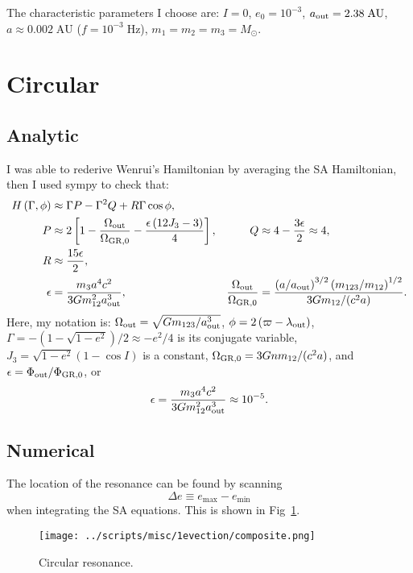 \documentclass[11pt,
        usenames, %
        dvipsnames %
    ]{article}
\newcommand*{\p}[1]{\left(#1\right)}
\newcommand*{\s}[1]{\left[#1\right]}
\begin{document}
The characteristic parameters I choose are: $I = 0$, $e_{0} = 10^{-3}$, $a_{\rm
out} = 2.38\;\mathrm{AU}$, $a \approx 0.002\;\mathrm{AU}$ ($f =
10^{-3}\;\mathrm{Hz}$), $m_1 = m_2 = m_3 = M_{\odot}$.

\section{Circular}

\subsection{Analytic}

I was able to rederive Wenrui's Hamiltonian by averaging the SA Hamiltonian,
then I used sympy to check that:
\begin{align}
    H\p{\Gamma,\phi} &\approx \Gamma P - \Gamma^2 Q + R \Gamma \cos \phi,&&\\
        P &\approx 2\s{1 - \frac{\Omega_{\rm out}}{\Omega_{\rm GR, 0}} -
            \frac{\epsilon\p{12 J_3 - 3}}{4}},&
        Q &\approx 4 - \frac{3\epsilon}{2} \approx 4,\nonumber\\
        R &\approx \frac{15\epsilon}{2},\\
        \epsilon &= \frac{m_3a^4 c^2}{3Gm_{12}^2a_{\rm out}^3},&
        \frac{\Omega_{\rm out}}{\Omega_{\rm GR, 0}}
            &= \frac{\p{a / a_{\rm out}}^{3/2}\p{m_{123} / m_{12}}^{1/2}}{
                3Gm_{12} / (c^2a)}.
\end{align}
Here, my notation is: $\Omega_{\rm out} = \sqrt{Gm_{123}/a_{\rm out}^3}$, $\phi
= 2\p{\varpi - \lambda_{\rm out}}$, $\Gamma = -\p{1 - \sqrt{1 - e^2}} / 2
\approx -e^2/4$ is its conjugate variable, $J_3 = \sqrt{1 - e^2}\p{1 - \cos I}$
is a constant, $\Omega_{\rm GR, 0} = 3Gnm_{12} / (c^2a)$, and $\epsilon =
\Phi_{\rm out} / \Phi_{\rm GR, 0}$, or
\begin{equation}
    \epsilon = \frac{m_3a^4 c^2}{3Gm_{12}^2a_{\rm out}^3} \approx 10^{-5}.
\end{equation}

\subsection{Numerical}

The location of the resonance can be found by scanning
\begin{equation}
    \Delta e \equiv e_{\max} - e_{\min}
\end{equation}
when integrating the SA equations. This is shown in
Fig~\ref{fig:composite_circ}.
\begin{figure}[h]
    \centering
    \texttt{[image: ../scripts/misc/1evection/composite.png]}
    \caption{Circular resonance.}\label{fig:composite_circ}
\end{figure}
\end{document}

